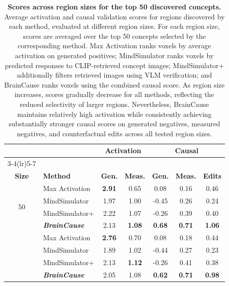 \begin{table}[h]
\centering
\setlength{\tabcolsep}{7pt}
\caption{\textbf{Scores across region sizes for the top 50 discovered concepts.}
Average activation and causal validation scores for regions discovered by each method, evaluated at different region sizes. For each region size, scores are averaged over the top 50 concepts selected by the corresponding method. Max Activation ranks voxels by average activation on generated positives; MindSimulator ranks voxels by predicted responses to CLIP-retrieved concept images; MindSimulator+ additionally filters retrieved images using VLM verification; and BrainCause ranks voxels using the combined causal score. As region size increases, scores gradually decrease for all methods, reflecting the reduced selectivity of larger regions. Nevertheless, BrainCause maintains relatively high activation while consistently achieving substantially stronger causal scores on generated negatives, measured negatives, and counterfactual edits across all tested region sizes.}
\vspace{+0.17cm}
\begin{tabular}{@{}clccccc@{}}
\toprule
& 
& \multicolumn{2}{c}{\textbf{Activation}}
& \multicolumn{3}{c}{\textbf{Causal}} \\
\cmidrule(lr){3-4}\cmidrule(lr){5-7}
\makecell{\textbf{ROI}\\\textbf{Size}}
& \textbf{Method}
& \textbf{Gen.}
& \textbf{Meas.}
& \textbf{Gen.}
& \textbf{Meas.}
& \textbf{Edits} \\
\midrule

\multirow{4}{*}{50}
& Max Activation
& \textbf{2.91} & 0.65 & 0.08 & 0.16 & 0.46 \\
& MindSimulator
& 1.97 & 1.00 & -0.45 & 0.26 & 0.24 \\
& MindSimulator+
& 2.22 & 1.07 & -0.26 & 0.39 & 0.40 \\
& \emph{\textbf{BrainCause}}
& 2.13 & \textbf{1.08} & \textbf{0.68} & \textbf{0.71} & \textbf{1.06} \\

\addlinespace[2pt]
\midrule

\multirow{4}{*}{100}
& Max Activation
& \textbf{2.76} & 0.70 & 0.08 & 0.18 & 0.44 \\
& MindSimulator
& 1.89 & 1.02 & -0.44 & 0.27 & 0.23 \\
& MindSimulator+
& 2.13 & \textbf{1.12} & -0.26 & 0.41 & 0.38 \\
& \emph{\textbf{BrainCause}}
& 2.05 & 1.08 & \textbf{0.62} & \textbf{0.71} & \textbf{0.98} \\


\end{tabular}
\end{table}
